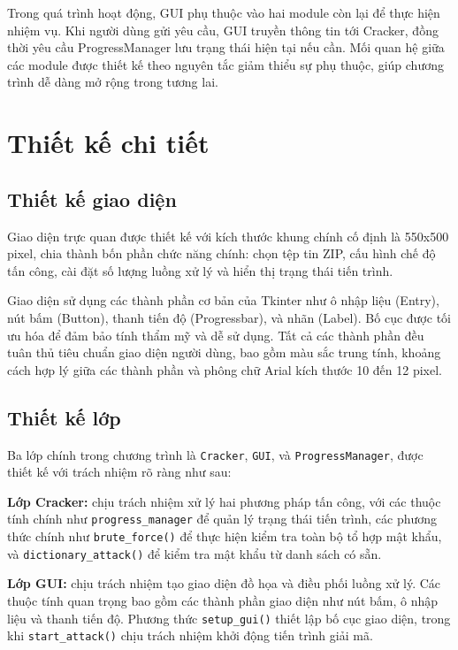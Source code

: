 \documentclass[../DoAn.tex]{subfiles}
\begin{document}
Trong quá trình hoạt động, GUI phụ thuộc vào hai module còn lại để thực hiện nhiệm vụ. Khi người dùng gửi yêu cầu, GUI truyền thông tin tới Cracker, đồng thời yêu cầu ProgressManager lưu trạng thái hiện tại nếu cần. Mối quan hệ giữa các module được thiết kế theo nguyên tắc giảm thiểu sự phụ thuộc, giúp chương trình dễ dàng mở rộng trong tương lai.

\section{Thiết kế chi tiết}

\subsection{Thiết kế giao diện}

Giao diện trực quan được thiết kế với kích thước khung chính cố định là 550x500 pixel, chia thành bốn phần chức năng chính: chọn tệp tin ZIP, cấu hình chế độ tấn công, cài đặt số lượng luồng xử lý và hiển thị trạng thái tiến trình.

Giao diện sử dụng các thành phần cơ bản của Tkinter như ô nhập liệu (Entry), nút bấm (Button), thanh tiến độ (Progressbar), và nhãn (Label). Bố cục được tối ưu hóa để đảm bảo tính thẩm mỹ và dễ sử dụng. Tất cả các thành phần đều tuân thủ tiêu chuẩn giao diện người dùng, bao gồm màu sắc trung tính, khoảng cách hợp lý giữa các thành phần và phông chữ Arial kích thước 10 đến 12 pixel.

\subsection{Thiết kế lớp}

Ba lớp chính trong chương trình là \verb|Cracker|, \verb|GUI|, và \verb|ProgressManager|, được thiết kế với trách nhiệm rõ ràng như sau:

\textbf{Lớp Cracker:} chịu trách nhiệm xử lý hai phương pháp tấn công, với các thuộc tính chính như \verb|progress_manager| để quản lý trạng thái tiến trình, các phương thức chính như \verb|brute_force()| để thực hiện kiểm tra toàn bộ tổ hợp mật khẩu, và \verb|dictionary_attack()| để kiểm tra mật khẩu từ danh sách có sẵn.

\textbf{Lớp GUI:} chịu trách nhiệm tạo giao diện đồ họa và điều phối luồng xử lý. Các thuộc tính quan trọng bao gồm các thành phần giao diện như nút bấm, ô nhập liệu và thanh tiến độ. Phương thức \verb|setup_gui()| thiết lập bố cục giao diện, trong khi \verb|start_attack()| chịu trách nhiệm khởi động tiến trình giải mã.
\end{document}

